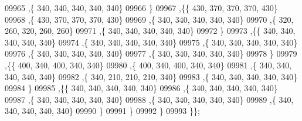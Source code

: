 \begin{DoxyCode}
09965     ,\{   340,   340,   340,   340,   340\}
09966     \}
09967    ,\{\{   430,   370,   370,   370,   430\}
09968     ,\{   430,   370,   370,   370,   430\}
09969     ,\{   340,   340,   340,   340,   340\}
09970     ,\{   320,   260,   320,   260,   260\}
09971     ,\{   340,   340,   340,   340,   340\}
09972     \}
09973    ,\{\{   340,   340,   340,   340,   340\}
09974     ,\{   340,   340,   340,   340,   340\}
09975     ,\{   340,   340,   340,   340,   340\}
09976     ,\{   340,   340,   340,   340,   340\}
09977     ,\{   340,   340,   340,   340,   340\}
09978     \}
09979    ,\{\{   400,   340,   400,   340,   340\}
09980     ,\{   400,   340,   400,   340,   340\}
09981     ,\{   340,   340,   340,   340,   340\}
09982     ,\{   340,   210,   210,   210,   340\}
09983     ,\{   340,   340,   340,   340,   340\}
09984     \}
09985    ,\{\{   340,   340,   340,   340,   340\}
09986     ,\{   340,   340,   340,   340,   340\}
09987     ,\{   340,   340,   340,   340,   340\}
09988     ,\{   340,   340,   340,   340,   340\}
09989     ,\{   340,   340,   340,   340,   340\}
09990     \}
09991    \}
09992   \}
09993  \}\};
\end{DoxyCode}
